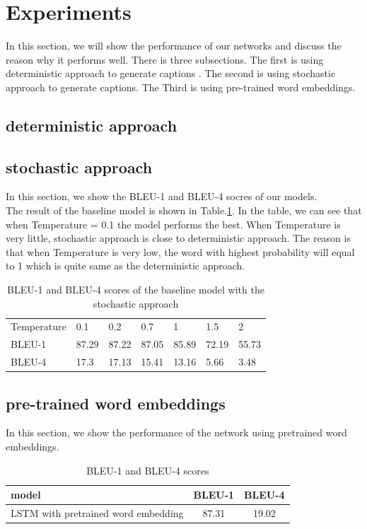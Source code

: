 \documentclass{article} %
\begin{document}
\section{Experiments}
In this section, we will show the performance of our networks and discuss the reason why it performs well. There is three subsections. The first is using deterministic approach to generate captions . The second is using stochastic approach to generate captions. The Third is using pre-trained word embeddings.
\subsection{deterministic approach}

\subsection{stochastic approach}
In this section, we show the BLEU-1 and BLEU-4 socres of our models.\\
The result of the baseline model is shown in Table.\ref{baseline_table}. In the table, we can see that when Temperature = 0.1 the model performs the best. When Temperature is very little, stochastic approach is close to deterministic approach. The reason is that when Temperature is very low, the word with highest probability will equal to 1 which is quite same as the deterministic approach.

\begin{table}[htb!]
    \begin{tabular}{lllllll}
    Temperature & 0.1   & 0.2   & 0.7   & 1     & 1.5   & 2     \\
    BLEU-1      & 87.29 & 87.22 & 87.05 & 85.89 & 72.19 & 55.73 \\
    BLEU-4      & 17.3  & 17.13 & 15.41 & 13.16 & 5.66  & 3.48 
    \end{tabular}
    \caption{BLEU-1 and BLEU-4 scores of the baseline model with the stochastic approach}
    \label{baseline_table}  
\end{table}

\subsection{pre-trained word embeddings}
In this section, we show the performance of the network using pretrained word embeddings.




\begin{table}[!htb]
    \caption{BLEU-1 and BLEU-4 scores}
    \label{acc}
    \centering
    \begin{tabular}{l|c|c|}
        \hline
        model & BLEU-1 & BLEU-4 \\
		\hline
		LSTM with pretrained word embedding&87.31&19.02\\
	    \hline
    \end{tabular}

\end{table}
\end{document}
